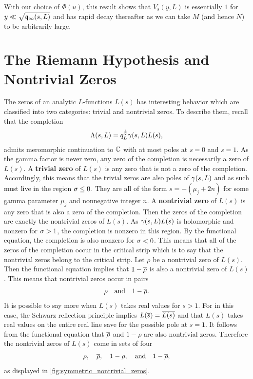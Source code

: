     With our choice of \(\Phi(u)\), this result shows that \(V_{s}(y,L)\) is essentially \(1\) for \(y \ll \sqrt{\mathfrak{q}_{\infty}(s,L)}\) and has rapid decay thereafter as we can take \(M\) (and hence \(N\)) to be arbitrarily large.
  \section{The Riemann Hypothesis and Nontrivial Zeros}
    The zeros of an analytic \(L\)-functions \(L(s)\) has interesting behavior which are classified into two categories: trivial and nontrivial zeros. To describe them, recall that the completion
    \[
      \Lambda(s,L) = q_{L}^{\frac{s}{2}}\gamma(s,L)L(s),
    \]
    admits meromorphic continuation to \(\mathbb{C}\) with at most poles at \(s = 0\) and \(s = 1\). As the gamma factor is never zero, any zero of the completion is necessarily a zero of \(L(s)\). A \textbf{trivial zero} of \(L(s)\) is any zero that is not a zero of the completion. Accordingly, this means that the trivial zeros are also poles of \(\gamma(s,L)\) and as such must live in the region \(\sigma \le 0\). They are all of the form \(s = -(\mu_{j}+2n)\) for some gamma parameter \(\mu_{j}\) and nonnegative integer \(n\). A \textbf{nontrivial zero} of \(L(s)\) is any zero that is also a zero of the completion. Then the zeros of the completion are exactly the nontrivial zeros of \(L(s)\). As \(\gamma(s,L)L(s)\) is holomorphic and nonzero for \(\sigma > 1\), the completion is nonzero in this region. By the functional equation, the completion is also nonzero for \(\sigma < 0\). This means that all of the zeros of the completion occur in the critical strip which is to say that the nontrivial zeros belong to the critical strip. Let \(\rho\) be a nontrivial zero of \(L(s)\). Then the functional equation implies that \(1-\overline{\rho}\) is also a nontrivial zero of \(L(s)\). This means that nontrivial zeros occur in pairs
    \[
      \rho \quad \text{and} \quad 1-\overline{\rho}.
    \]
    It is possible to say more when \(L(s)\) takes real values for \(s > 1\). For in this case, the Schwarz reflection principle implies \(L(\overline{s}) = \overline{L(s)}\) and that \(L(s)\) takes real values on the entire real line save for the possible pole at \(s = 1\). It follows from the functional equation that \(\overline{\rho}\) and \(1-\rho\) are also nontrivial zeros. Therefore the nontrivial zeros of \(L(s)\) come in sets of four
    \[
      \rho, \quad \overline{\rho}, \quad 1-\rho, \quad \text{and} \quad 1-\overline{\rho},
    \]
    as displayed in \cref{fig:symmetric_nontrivial_zeros}.

